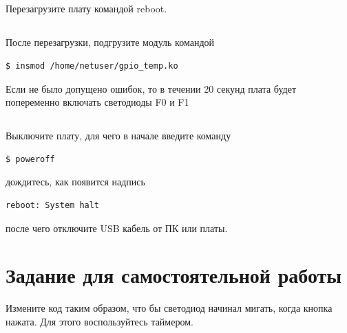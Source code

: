 \subsection{} Перезагрузите плату командой reboot.

\subsection{} После перезагрузки, подгрузите модуль командой
\begin{lstlisting}[style=bash]
$ insmod /home/netuser/gpio_temp.ko
\end{lstlisting}
Если не было допущено ошибок, то в течении 20 секунд плата будет попеременно включать светодиоды F0 и F1

\subsection{} Выключите плату, для чего в начале введите команду
\begin{lstlisting}[style=bash]
	$ poweroff
\end{lstlisting}
дождитесь, как появится надпись
\begin{lstlisting}[style=stdout]
	reboot: System halt
\end{lstlisting}
после чего отключите USB кабель от ПК или платы. 

\section{Задание для самостоятельной работы}
Измените код таким образом, что бы светодиод начинал мигать, когда кнопка нажата. Для этого воспользуйтесь таймером.

